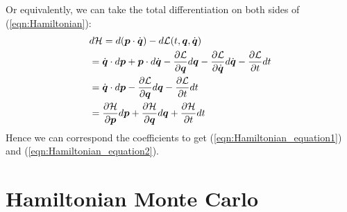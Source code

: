 \documentclass[hidelinks]{article}[12pt]
\begin{document}
Or equivalently, we can take the total differentiation on both sides of (\ref{eqn:Hamiltonian}):
\begin{align*}
& d{\cal H} = d(\boldsymbol{p}\cdot \dot{\boldsymbol{q}}) - d{\cal L}(t, \boldsymbol{q}, \dot{\boldsymbol{q}})\\
& = \dot{\boldsymbol{q}}\cdot d\boldsymbol{p} + \boldsymbol{p} \cdot d\dot{\boldsymbol{q}} - \frac{\partial{{\cal L}}}{\partial{\boldsymbol{q}}}d\boldsymbol{q} - \frac{\partial{{\cal L}}}{\partial{\dot{\boldsymbol{q}}}}d\dot{\boldsymbol{q}} - \frac{\partial{{\cal L}}}{\partial{t}}dt\\
& = \dot{\boldsymbol{q}}\cdot d\boldsymbol{p} - \frac{\partial{{\cal L}}}{\partial{\boldsymbol{q}}}d\boldsymbol{q} - \frac{\partial{{\cal L}}}{\partial{t}}dt\\
& = \frac{\partial{{\cal H}}}{\partial{\boldsymbol{p}}}d\boldsymbol{p} + \frac{\partial{{\cal H}}}{\partial{\boldsymbol{q}}} d\boldsymbol{q} + \frac{\partial{{\cal H}}}{\partial{t}}dt
\end{align*}
Hence we can correspond the coefficients to get (\ref{eqn:Hamiltonian_equation1}) and (\ref{eqn:Hamiltonian_equation2}).

\section{Hamiltonian Monte Carlo}
\end{document}
